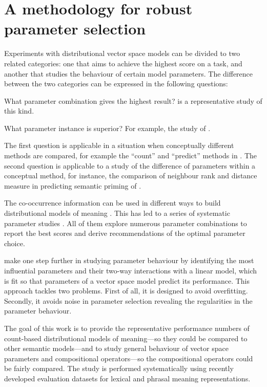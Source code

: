 \chapter{A methodology for robust parameter selection}
\label{sec:methodology}

Experiments with distributional vector space models can be divided to two related categories: one that aims to achieve the highest score on a task, and another that studies the behaviour of certain model parameters. The difference between the two categories can be expressed in the following questions:

\begin{compactitem}
\item What parameter combination gives the highest result?  is a representative study of this kind.
\item What parameter instance is superior? For example, the study of .
\end{compactitem}

The first question is applicable in a situation when conceptually different methods are compared, for example the ``count'' and  ``predict'' methods in . The second question is applicable to a study of the difference of parameters within a conceptual method, for instance, the comparison of neighbour rank and distance measure in predicting semantic priming of .

The co-occurrence information can be used in different ways to build distributional models of meaning \cite{Turney:2010:FMV:1861751.1861756}. This has led to a series of systematic parameter studies \cite{Bullinaria2007,BullinariaLevy2012,kiela-clark:2014:CVSC,lapesa2014large,TACL570}. All of them explore numerous parameter combinations to report the best scores and derive recommendations of the optimal parameter choice.

 make one step further in studying parameter behaviour by identifying the most influential parameters and their two-way interactions with a linear model, which is fit so that parameters of a vector space model predict its performance. This approach tackles two problems. First of all, it is designed to avoid overfitting. Secondly, it avoids noise in parameter selection revealing the regularities in the parameter behaviour.

The goal of this work is to provide the representative performance numbers of count-based distributional models of meaning---so they could be compared to other semantic models---and to study general behaviour of vector space parameters and compositional operators---so the compositional operators could be fairly compared. The study is performed systematically using recently developed evaluation datasets for lexical and phrasal meaning representations.

